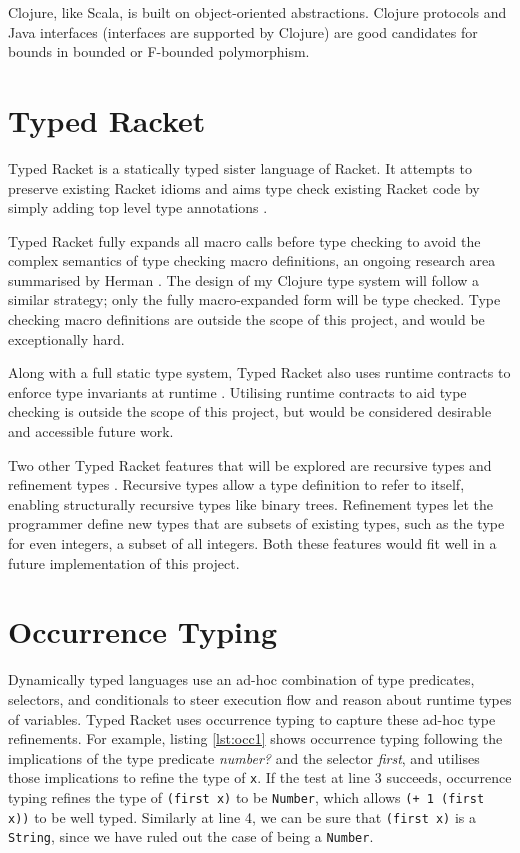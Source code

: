 \documentclass[12pt, a4paper]{article}
\begin{document}
Clojure, like Scala, is built on object-oriented abstractions. Clojure protocols
and Java interfaces (interfaces are supported by Clojure) are good candidates
for bounds in bounded or F-bounded polymorphism.

\section{Typed Racket}

Typed Racket is a statically typed sister language of Racket. It
attempts to preserve existing Racket idioms and aims type check
existing Racket code by simply adding top level type annotations \cite{SAMTH:dissertation}.

Typed Racket fully expands all macro calls before type checking \cite{SAMTH:dissertation} to
avoid the complex semantics of type checking macro definitions, an ongoing research area summarised
 by Herman \cite{Herman10:Theory}.
The design of my Clojure type system will follow a similar strategy; only the fully macro-expanded form
will be type checked. Type checking macro definitions are outside the scope of this project, and would
be exceptionally hard.

Along with a full static type system, Typed Racket 
also uses runtime contracts to enforce type invariants at runtime \cite{Tobin-Hochstadt:2008:DIT:1328897.1328486}.
Utilising runtime contracts to aid type checking is outside the scope of this project, but would be 
considered desirable and accessible future work.

Two other Typed Racket features that will be explored are recursive types and refinement types  
\cite{SAMTH:dissertation}. Recursive types allow a type definition to refer to itself, enabling structurally
recursive types like binary trees. Refinement types let the programmer define
new types that are subsets of existing types, such as the type for even integers, a subset of all integers.
Both these features would fit well in a future implementation of this project.

\section{Occurrence Typing}
\label{sec:OccurrenceTyping}

Dynamically typed languages use an ad-hoc combination of type predicates,
selectors, and conditionals to steer execution flow and reason about runtime types of variables.
Typed Racket uses occurrence typing to capture these ad-hoc type refinements.
For example, listing \ref{lst:occ1} shows occurrence typing following the implications 
of the type predicate \emph{number?} and the selector \emph{first}, and utilises those implications to refine
the type of \lstinline|x|. If the test at line 3 succeeds, occurrence typing refines the
type of \lstinline|(first x)| to be \lstinline|Number|, which allows \lstinline|(+ 1 (first x))|
to be well typed. Similarly at line 4, we can be sure that \lstinline|(first x)| is
a \lstinline|String|, since we have ruled out the case of being a \lstinline|Number|.
\end{document}
